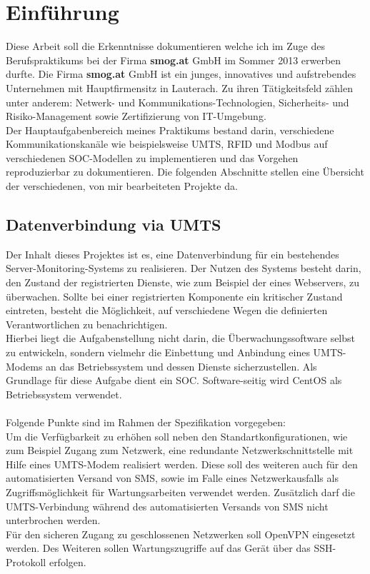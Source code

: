 \documentclass[Bachelorarbeit.tex]{subfiles}
\begin{document}
\chapter{Einführung}

Diese Arbeit soll die Erkenntnisse dokumentieren welche ich im Zuge des Berufspraktikums  bei der Firma \textbf{smog.at} GmbH im Sommer 2013 erwerben durfte.
Die Firma \textbf{smog.at} GmbH ist ein junges, innovatives und aufstrebendes Unternehmen mit Hauptfirmensitz in Lauterach. Zu ihren Tätigkeitsfeld zählen unter anderem: Netwerk- und Kommunikations-Technologien, Sicherheits- und Risiko-Management sowie Zertifizierung von IT-Umgebung.\\
Der Hauptaufgabenbereich meines Praktikums bestand darin, verschiedene Kommunikationskanäle wie beispielsweise \acf{UMTS}, \acf{RFID} und Modbus auf verschiedenen \acf{SOC}-Modellen zu implementieren und das Vorgehen reproduzierbar zu dokumentieren. Die folgenden Abschnitte stellen eine Übersicht der verschiedenen, von mir bearbeiteten Projekte da.

\section*{Datenverbindung via \ac{UMTS}}
Der Inhalt dieses Projektes ist es, eine Datenverbindung für ein bestehendes Server-Monitoring-Systems zu realisieren. 
Der Nutzen des Systems besteht darin, den Zustand der registrierten Dienste, wie zum Beispiel der eines Webservers, zu überwachen. 
Sollte bei einer registrierten Komponente ein kritischer Zustand eintreten, besteht die Möglichkeit, auf verschiedene Wegen die definierten Verantwortlichen zu benachrichtigen. \\
Hierbei liegt die Aufgabenstellung nicht darin, die Überwachungssoftware selbst zu entwickeln, sondern vielmehr die Einbettung und Anbindung eines \ac{UMTS}-Modems an das Betriebssystem und dessen Dienste sicherzustellen. 
Als Grundlage für diese Aufgabe dient ein \ac{SOC}. 
Software-seitig wird CentOS als Betriebssystem verwendet.\\
\\
Folgende Punkte sind im Rahmen der Spezifikation vorgegeben:\\
Um die Verfügbarkeit zu erhöhen soll neben den Standartkonfigurationen, wie zum Beispiel Zugang zum Netzwerk, eine redundante Netzwerkschnittstelle mit Hilfe eines \ac{UMTS}-Modem realisiert werden. 
Diese soll des weiteren auch für den automatisierten Versand von SMS, sowie im Falle eines Netzwerkausfalls als Zugriffsmöglichkeit für Wartungsarbeiten verwendet werden. 
Zusätzlich darf die \ac{UMTS}-Verbindung während des automatisierten Versands von SMS nicht unterbrochen werden. \\
Für den sicheren Zugang zu geschlossenen Netzwerken soll OpenVPN eingesetzt werden. 
Des Weiteren sollen Wartungszugriffe auf das Gerät über das \ac{SSH}-Protokoll  erfolgen.
\end{document}

